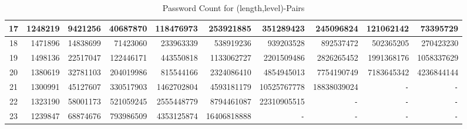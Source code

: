 \documentclass{article} %
\theoremstyle{definition}
\theoremstyle{theorem}
\theoremstyle{remark}
\theoremstyle{remark}
\begin{document}
\begin{table}[!htbp]
\begin{center}
\begin{tabular}{|c||r|r|r|r|r|r|r|r|r|}
                17 & 1248219 & 9421256 & 40687870 & 118476973 & 253921885 & 351289423 &  245096824 & 121062142 & 73395729 \\\hline
                18 & 1471896 & 14838699 & 71423060 & 233963339 & 538919236 & 939203528 & 892537472 & 502365205 & 270423230 \\\hline
                19 & 1498136 & 22517047 & 122446171 & 443550818 & 1133062727 & 2201509486 & 2826265452 & 1991368176 & 1058337629 \\\hline
                20 & 1380619 & 32781103 & 204019986 & 815544166 & 2324086410 & 4854945013 & 7754190749 & 7183645342 & 4236844144 \\\hline
                21 & 1300991 & 45127607 & 330517903 & 1462702804 & 4593181179 & 10525767778 & 18838039024 & \texttt{-} & \texttt{-} \\\hline
                22 & 1323190 & 58001173 & 521059245 & 2555448779 & 8794461087 & 22310905515 & \texttt{-} & \texttt{-} & \texttt{-} \\\hline
                23 & 1239847 & 68874676 & 793986509 & 4353125874 & 16406818888 & \texttt{-} & \texttt{-} & \texttt{-} & \texttt{-} \\\hline
            \end{tabular}
        \end{center}
        \vspace{-5pt}
        \caption{Password Count for (length,level)-Pairs}
        \label{table:passcount}
    \end{table}
\end{document}
